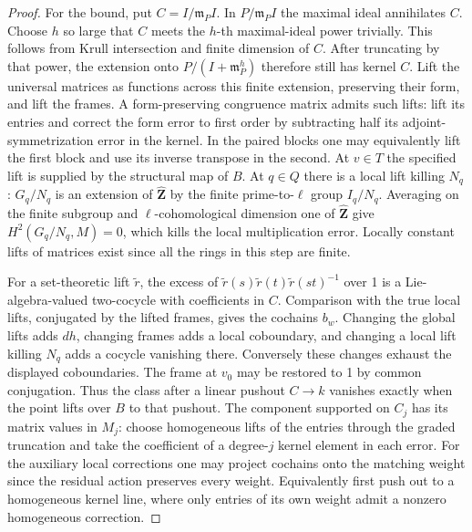 \begin{proof}
For the bound, put \(C=I/\mathfrak m_PI\). In
\(P/\mathfrak m_PI\) the maximal ideal annihilates \(C\). Choose \(h\)
so large that \(C\) meets the \(h\)-th maximal-ideal power trivially.
This follows from Krull intersection and finite dimension of \(C\).
After truncating by that power, the extension onto \(P/(I+\mathfrak
m_P^h)\) therefore still has kernel \(C\). Lift the universal matrices
as functions across this finite extension, preserving their form,
and lift the frames. A form-preserving congruence matrix admits such
lifts: lift its entries and correct the form error to first order
by subtracting half its adjoint-symmetrization error in the kernel.
In the paired blocks one may equivalently lift the first block and
use its inverse transpose in the second. At \(v\in T\) the specified
lift is supplied by the structural map of \(B\). At \(q\in Q\)
there is a local lift killing \(N_q\): \(G_q/N_q\) is an extension
of \(\widehat{\mathbf Z}\) by the finite prime-to-\(\ell\) group
\(I_q/N_q\). Averaging on the finite subgroup and
\(\ell\)-cohomological dimension one of \(\widehat{\mathbf Z}\)
give \(H^2(G_q/N_q,M)=0\), which kills the local multiplication
error. Locally constant lifts of matrices exist since all the rings
in this step are finite.

For a set-theoretic lift \(\widetilde r\), the excess of
\(\widetilde r(s)\widetilde r(t)\widetilde r(st)^{-1}\) over 1
is a Lie-algebra-valued two-cocycle with coefficients in \(C\).
Comparison with the true local lifts, conjugated by the lifted
frames, gives the cochains \(b_w\). Changing the global lifts
adds \(dh\), changing frames adds a local coboundary, and changing
a local lift killing \(N_q\) adds a cocycle vanishing there.
Conversely these changes exhaust the displayed coboundaries. The
frame at \(v_0\) may be restored to 1 by common conjugation. Thus
the class after a linear pushout \(C\to k\) vanishes exactly when
the point lifts over \(B\) to that pushout. The component supported
on \(C_j\) has its matrix values in \(M_j\): choose homogeneous lifts
of the entries through the graded truncation and take the coefficient
of a degree-\(j\) kernel element in each error. For the auxiliary
local corrections one may project cochains onto the matching weight
since the residual action preserves every weight. Equivalently first
push out to a homogeneous kernel line, where only entries of its own
weight admit a nonzero homogeneous correction.


\end{proof}

